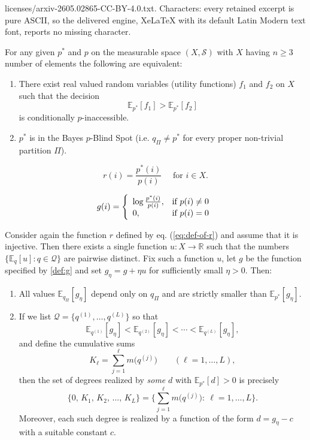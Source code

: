 \documentclass[10pt,a4paper]{amsart}
\newcommand{\E}{\mathbb E}
\begin{document}
licenses/arxiv-2605.02865-CC-BY-4.0.txt. Characters: every retained excerpt is pure ASCII, so the delivered engine, XeLaTeX with its default Latin Modern text font, reports no missing character.
\begin{theorem}\label{thm:main1}
	For any given $p^*$ and $p$ on the measurable space $(X,\mathcal{S})$ with $X$ having $n\geq 3$ number of elements the following are equivalent:
	\begin{enumerate}
		\item[(A)] There exist real valued random variables (utility functions) $f_1$ and $f_2$ on $X$ such that the decision 
        \begin{equation}\label{eq:decision-in proof}
        \E_{p^*}[f_1]>\E_{p^*}[f_2]    
        \end{equation}  
        is conditionally $p$-inaccessible.
		\item[(B)] $p^*$ is in the Bayes $p$-Blind Spot (i.e. $q_\Pi\neq p^*$ for every proper non-trivial partition $\Pi$).
	\end{enumerate}	
\end{theorem}

	\begin{equation}\label{eq:def-of-r}
		r(i)=\frac{p^*(i)}{p(i)} \quad \text{ for } i\in X.
	\end{equation}

	\begin{equation}\label{def:g}
		g(i)=\left\{
  \begin{array}{ll}
    \log\frac{p^*(i)}{p(i)}, & \hbox{if\ } p(i)\not=0 \\
    0, & \hbox{if\ } p(i)=0
  \end{array}
\right.
	\end{equation}

\begin{theorem}\label{thm:degrees}
	Consider again the function $r$ defined by eq. (\ref{eq:def-of-r}) and assume that it is injective. Then there exists a single function $u:X\to\mathbb R$ such that the numbers
	$\{\E_q[u]:q\in\mathcal Q\}$ are pairwise distinct. Fix such a function $u$, let $g$ be the function specified by \eqref{def:g} and set $g_\eta=g+\eta u$
	for sufficiently small $\eta>0$.
	Then:
	\begin{enumerate}
		\item All values $\E_{q_\Pi}[g_\eta]$ depend only on $q_\Pi$ and are strictly smaller than $\E_{p^*}[g_\eta]$.
		\item If we list $\mathcal Q=\{q^{(1)},\dots,q^{(L)}\}$ so that
		\[
			\E_{q^{(1)}}[g_\eta]<\E_{q^{(2)}}[g_\eta]<\cdots<\E_{q^{(L)}}[g_\eta],
		\]
		and define the cumulative sums
		\[
			K_\ell=\sum_{j=1}^{\ell} m\big(q^{(j)}\big)\qquad(\ell=1,\dots,L),
		\]
		then the set of degrees realized by \emph{some} $d$ with $\E_{p^*}[d]>0$ is precisely
		\[
			\{0,\,K_1,\,K_2,\,\dots,\,K_L\}=\Big\{\sum_{j=1}^{\ell} m\big(q^{(j)}\big):\ \ell = 1, \ldots, L\Big\}.
		\]
		Moreover, each such degree is realized by a function of the form $d=g_\eta-c$ with a suitable constant $c$.
	\end{enumerate}
\end{theorem}
\end{document}
